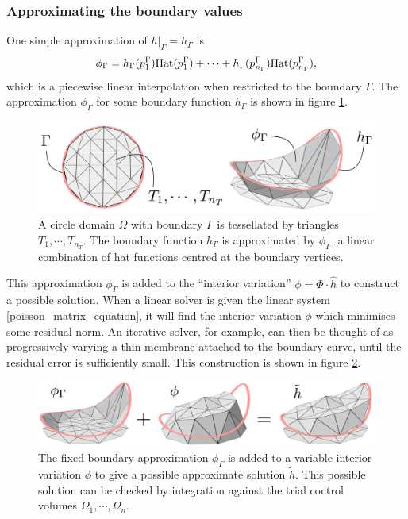 \subsubsection{Approximating the boundary values}
One simple approximation of $\left.h\right|_\Gamma = h_\Gamma$ is
\begin{equation}\label{boundary_approximation}
    \phi_\Gamma = h_\Gamma(p^\Gamma_1)\text{Hat}(p^\Gamma_1)
                + \cdots
                + h_\Gamma(p^\Gamma_{n_\Gamma})\text{Hat}(p^\Gamma_{n_\Gamma}),
\end{equation}
which is a piecewise linear interpolation when restricted to the boundary $\Gamma$. The approximation $\phi_\Gamma$ for some boundary
function $h_\Gamma$ is shown in figure \ref{boundary}.
\begin{figure}[H]
    \begin{center}
        \includegraphics[width=0.9\linewidth]{figures/boundary/boundary.png}
    \end{center}
    \caption{\scriptsize
        A circle domain $\Omega$ with boundary $\Gamma$ is tessellated by triangles $T_1,\cdots,T_{n_T}$.
        The boundary function $h_\Gamma$ is approximated by $\phi_\Gamma$, a linear combination of hat functions centred at the boundary vertices.
    }
    \label{boundary}
\end{figure}
This approximation $\phi_\Gamma$ is added to the ``interior variation'' $\phi = \Phi\cdot\hat{h}$ to construct a possible solution.
When a linear solver is given the linear system \eqref{poisson_matrix_equation}, it will find the interior variation $\phi$
which minimises some residual norm. An iterative solver, for example, can then be thought of as progressively varying a thin membrane attached
to the boundary curve,
until the residual error is sufficiently small. This construction is shown in figure \ref{laplaceboundary}.
\begin{figure}[H]
    \begin{center}
        \includegraphics[width=1\linewidth]{figures/laplaceboundary/laplaceboundaryv2.png}
    \end{center}
    \caption{\scriptsize
        The fixed boundary approximation $\phi_\Gamma$ is added to a variable interior variation $\phi$ to give a possible approximate solution $\tilde{h}$.
        This possible solution can be checked by integration against the trial control volumes $\Omega_1,\cdots,\Omega_n$.
    }
    \label{laplaceboundary}
\end{figure}

